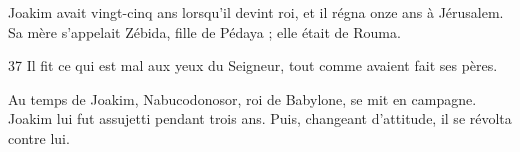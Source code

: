  Joakim avait vingt-cinq ans lorsqu’il devint roi, et il régna onze ans à Jérusalem. Sa mère s’appelait Zébida, fille de Pédaya ; elle était de Rouma.

37 Il fit ce qui est mal aux yeux du Seigneur, tout comme avaient fait ses pères.

Au temps de Joakim, Nabucodonosor, roi de Babylone, se mit en campagne. Joakim lui fut assujetti pendant trois ans. Puis, changeant d’attitude, il se révolta contre lui.
